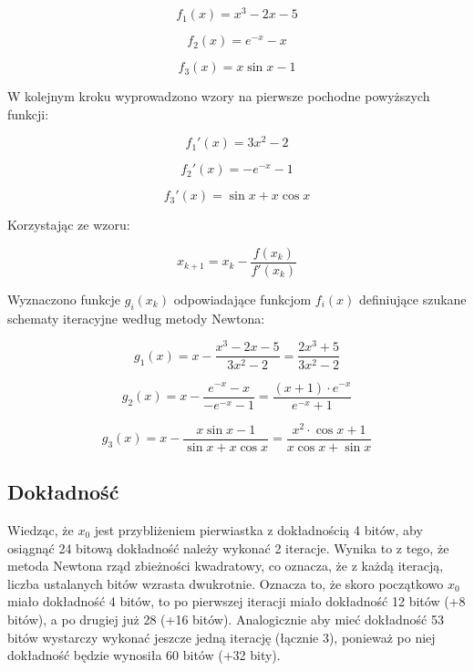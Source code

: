 \documentclass{article}
\begin{document}
	\begin{equation}
		f_1(x) = x^3 - 2x -5
	\end{equation}

	\begin{equation}
		f_2(x) = e^{-x} - x
	\end{equation}

	\begin{equation}
		f_3(x) = x \sin x - 1
	\end{equation}


	W kolejnym kroku wyprowadzono wzory na pierwsze pochodne powyższych funkcji:

	\begin{equation}
		f_1'(x) = 3x^2 - 2
	\end{equation}

	\begin{equation}
		f_2'(x) = -e^{-x} - 1
	\end{equation}

	\begin{equation}
		f_3'(x) = \sin x + x \cos x
	\end{equation}

	Korzystając ze wzoru:

	\begin{equation}
		x_{k+1} = x_k - \frac{f(x_k)}{f'(x_k)} 
	\end{equation}

	Wyznaczono funkcje $g_i(x_k)$ odpowiadające funkcjom $f_i(x)$ definiujące szukane schematy iteracyjne według metody Newtona:

	\begin{equation}
		g_1(x) = x - \frac{x^3 - 2x -5}{3x^2 - 2} = \frac{2x^3+5}{3x^2-2}
	\end{equation}

	\begin{equation}
		g_2(x) = x - \frac{e^{-x} - x}{-e^{-x} - 1} = \frac{(x+1) \cdot e^{-x}}{e^{-x} + 1}
	\end{equation}

	\begin{equation}
		g_3(x) = x - \frac{x \sin x - 1}{\sin x + x \cos x} = \frac{x^2 \cdot \cos x + 1}{x \cos x + \sin x}
	\end{equation}

	\subsection*{Dokładność}

	Wiedząc, że $x_0$ jest przybliżeniem pierwiastka z dokładnością 4 bitów, aby osiągnąć 24 bitową dokładność należy wykonać 2 iteracje. Wynika to z tego, że metoda Newtona rząd zbieżności kwadratowy, co oznacza, że z każdą iteracją, liczba ustalanych bitów wzrasta dwukrotnie. Oznacza to, że skoro początkowo $x_0$ miało dokładność 4 bitów, to po pierwszej iteracji miało dokładność 12 bitów (+8 bitów), a po drugiej już 28 (+16 bitów). Analogicznie aby mieć dokładność 53 bitów wystarczy wykonać jeszcze jedną iterację (łącznie 3), ponieważ po niej dokładność będzie wynosiła 60 bitów (+32 bity).
\end{document}

